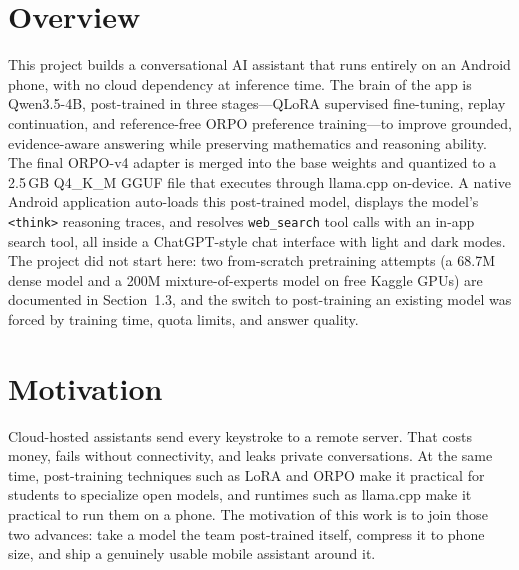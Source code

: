 \documentclass[12pt,a4paper]{report}
\begin{document}
\section{Overview}
This project builds a conversational AI assistant that runs entirely on
an Android phone, with no cloud dependency at inference time. The brain
of the app is Qwen3.5-4B, post-trained in three stages---QLoRA
supervised fine-tuning, replay continuation, and reference-free ORPO
preference training---to improve grounded, evidence-aware answering
while preserving mathematics and reasoning ability. The final ORPO-v4
adapter is merged into the base weights and quantized to a 2.5\,GB
Q4\_K\_M GGUF file that executes through llama.cpp on-device. A native
Android application auto-loads this post-trained model, displays the
model's \texttt{<think>} reasoning traces, and resolves
\texttt{web\_search} tool calls with an in-app search tool, all inside
a ChatGPT-style chat interface with light and dark modes. The project
did not start here: two from-scratch pretraining attempts (a 68.7M
dense model and a 200M mixture-of-experts model on free Kaggle GPUs)
are documented in Section~1.3, and the switch to post-training an
existing model was forced by training time, quota limits, and answer
quality.
\section{Motivation}
Cloud-hosted assistants send every keystroke to a remote server. That
costs money, fails without connectivity, and leaks private
conversations. At the same time, post-training techniques such as LoRA
and ORPO make it practical for students to specialize open models, and
runtimes such as llama.cpp make it practical to run them on a phone.
The motivation of this work is to join those two advances: take a model
the team post-trained itself, compress it to phone size, and ship a
genuinely usable mobile assistant around it.
\end{document}
